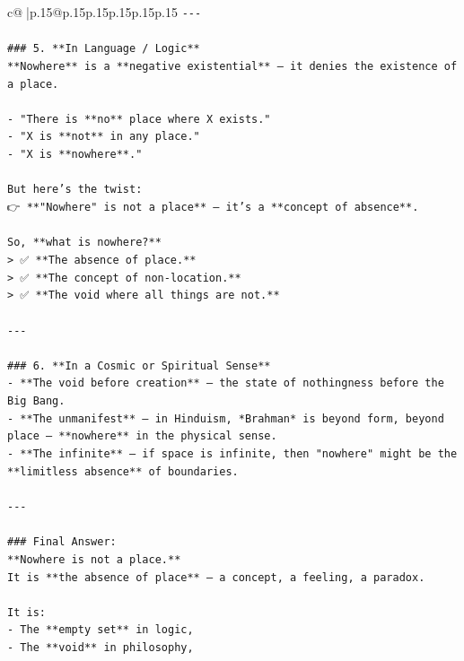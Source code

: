 \documentclass{article}
\begin{document}
{\begin{supertabular}{c@{$\;$}|p{.15\linewidth}@{}p{.15\linewidth}p{.15\linewidth}p{.15\linewidth}p{.15\linewidth}p{.15\linewidth}}
{{{\texttt{{-}{-}{-}} \\
\\ 
\texttt{\#\#\# 5. **In Language / Logic**} \\
\texttt{**Nowhere** is a **negative existential** — it denies the existence of a place.} \\
\\ 
\texttt{{-} "There is **no** place where X exists."} \\
\texttt{{-} "X is **not** in any place."} \\
\texttt{{-} "X is **nowhere**."} \\
\\ 
\texttt{But here’s the twist:  } \\
\texttt{👉 **"Nowhere" is not a place** — it’s a **concept of absence**.} \\
\\ 
\texttt{So, **what is nowhere?**  } \\
\texttt{> ✅ **The absence of place.**  } \\
\texttt{> ✅ **The concept of non{-}location.**  } \\
\texttt{> ✅ **The void where all things are not.**} \\
\\ 
\texttt{{-}{-}{-}} \\
\\ 
\texttt{\#\#\# 6. **In a Cosmic or Spiritual Sense**} \\
\texttt{{-} **The void before creation** — the state of nothingness before the Big Bang.} \\
\texttt{{-} **The unmanifest** — in Hinduism, *Brahman* is beyond form, beyond place — **nowhere** in the physical sense.} \\
\texttt{{-} **The infinite** — if space is infinite, then "nowhere" might be the **limitless absence** of boundaries.} \\
\\ 
\texttt{{-}{-}{-}} \\
\\ 
\texttt{\#\#\# Final Answer:} \\
\texttt{**Nowhere is not a place.**  } \\
\texttt{It is **the absence of place** — a concept, a feeling, a paradox.} \\
\\ 
\texttt{It is:} \\
\texttt{{-} The **empty set** in logic,} \\
\texttt{{-} The **void** in philosophy,} \\
}}}
\end{supertabular}}
\end{document}
